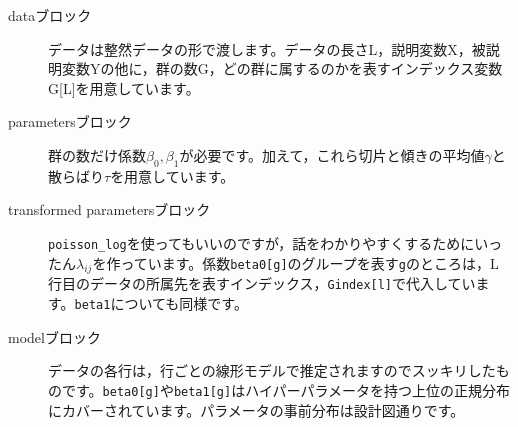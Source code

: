 \begin{description}
	\item[dataブロック] データは整然データの形で渡します。データの長さL，説明変数X，被説明変数Yの他に，群の数G，どの群に属するのかを表すインデックス変数G[L]を用意しています。
	\item[parametersブロック] 群の数だけ係数$\beta_0,\beta_1$が必要です。加えて，これら切片と傾きの平均値$\gamma$と散らばり$\tau$を用意しています。
	\item[transformed parametersブロック] \verb|poisson_log|を使ってもいいのですが，話をわかりやすくするためにいったん$\lambda_{ij}$を作っています。係数\verb|beta0[g]|のグループを表す\verb|g|のところは，L行目のデータの所属先を表すインデックス，\verb|Gindex[l]|で代入しています。\verb|beta1|についても同様です。
	\item[modelブロック] データの各行は，行ごとの線形モデルで推定されますのでスッキリしたものです。\verb|beta0[g]|や\verb|beta1[g]|はハイパーパラメータを持つ上位の正規分布にカバーされています。パラメータの事前分布は設計図通りです。
\end{description}
